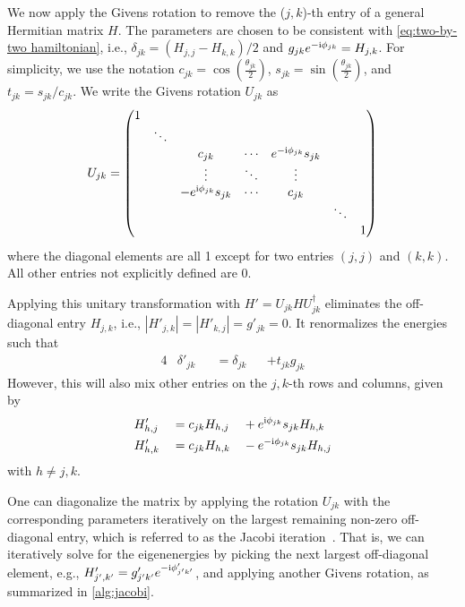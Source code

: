 \documentclass[%
 reprint,
 amsmath,amssymb,
 aps,
pra,
noeprint,
superscriptaddress,
]{revtex4-2}
\newcommand{\imagi}{\textnormal{i}}
\begin{document}
We now apply the Givens rotation to remove the ($j,k$)-th entry of a general Hermitian matrix $H$.
The parameters are chosen to be consistent with \cref{eq:two-by-two hamiltonian}, i.e., $\delta_{jk}=(H_{j,j}-H_{k,k})/2$ and $g_{jk}e^{-\imagi\phi_{jk}}=H_{j,k}$.
For simplicity, we use the notation $c_{jk}=\cos(\frac{\theta_{jk}}{2})$, $s_{jk}=\sin(\frac{\theta_{jk}}{2})$, and $t_{jk} = s_{jk}/c_{jk}$.
We write the Givens rotation $U_{jk}$ as
\begin{align}
    U_{jk} = 
    \begin{pmatrix}
     1 &      &      &      &      &      &    \\
      &\ddots&      &      &      &      &   \\
      &      & c_{jk} &\cdots   &e^{-\imagi\phi_{jk}}s_{jk}   &      &   \\
      &      &\vdots&\ddots&\vdots&      &    \\
      &      & -e^{\imagi\phi_{jk}} s_{jk} &\cdots& c_{jk}    &      &   \\
      &      &      &      &      &\ddots&  \\
      &      &      &      &      &      &  1
    \end{pmatrix}
  \label{eq:givens rotation full}
\end{align}
where the diagonal elements are all 1 except for two entries $(j,j)$ and $(k,k)$. All other entries not explicitly defined are 0.


Applying this unitary transformation with $H'=U_{jk}HU_{jk}^{\dagger}$ eliminates the off-diagonal entry $H_{j,k}$, i.e., $|H'_{j,k}| = |H'_{k,j}| = g'_{jk}= 0$. It renormalizes the energies such that
\begin{alignat}{4}
    \label{eq:jacobi elementwise1}
    &\delta'_{jk} &&= \delta_{jk} &&+ t_{jk} g_{jk} 
\end{alignat}
However, this will also mix other entries on the $j,k$-th rows and columns, given by
\begin{alignat}{4}
    \label{eq:jacobi off diagonal1}
    &H'_{h,j} &&= c_{jk} H_{h,j} &&+ e^{\imagi\phi_{jk}}s_{jk}  H_{h,k} \\
    \label{eq:jacobi off diagonal2}
    &H'_{h,k} &&=c_{jk} H_{h,k} &&- e^{-\imagi\phi_{jk}}s_{jk} H_{h,j}
\end{alignat}
with
$h\neq j,k$.


One can diagonalize the matrix by applying the rotation $U_{jk}$ with the corresponding parameters iteratively on the largest remaining non-zero off-diagonal entry, which is referred to as the Jacobi iteration~\cite{jacobi1846}.
That is, we can iteratively solve for the eigenenergies by picking the next largest off-diagonal element, e.g., $H'_{j',k'}=g'_{j'k'}e^{-\imagi\phi'_{j'k'}}$, and applying another Givens rotation, as summarized in \cref{alg:jacobi}.
\end{document}
